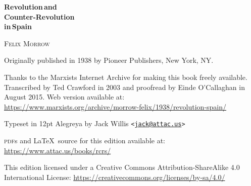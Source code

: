 \begin{titlepage}
	\setlength{\parindent}{0pt}
	
	\vspace*{\fill}
	
	{\sffamily\bfseries\fontsize{42}{42}\selectfont
		Revolution\,\textmd{and} \\
		Counter-Revolution \\
		\textmd{in}\,Spain
		\par}
	
	\vspace{63pt}
	
	{\fontsize{21}{21}\selectfont
		\textsc{Felix Morrow}
		\par}
	
	\vspace*{\fill}
	
\end{titlepage}

{
	\thispagestyle{empty}
	\setlength{\parindent}{0em}
	\setlength{\parskip}{0.5em}
	\sloppy
	
	\vspace*{\fill}
	
	Originally published in 1938 by Pioneer Publishers, New York, NY.
	
	Thanks to the Marxists Internet Archive
	for making this book freely available.
	Transcribed by Ted Crawford in 2003
	and proofread by Einde O’Callaghan in August 2015.
	Web version available at:
	\url{https://www.marxists.org/archive/morrow-felix/1938/revolution-spain/}
	
	Typeset in 12pt Alegreya by Jack Willis
	\texttt{<\href{mailto:jack@attac.us}{jack@attac.us}>}
	
	\textsc{pdf}s and \LaTeX\ source for this edition available at: \url{https://www.attac.us/books/rcrs/}
	
	This edition licensed under a Creative Commons Attribution-Share\-Alike 4.0 International License:
	\url{https://creativecommons.org/licenses/by-sa/4.0/}
}